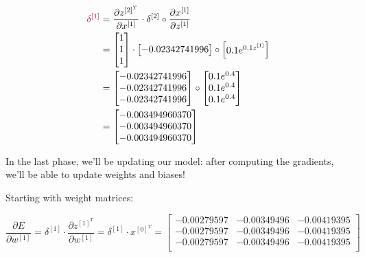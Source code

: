 \documentclass[12pt]{article}
\begin{document}
\begin{enumerate}[leftmargin=\labelsep]
        \begin{equation*}
          \begin{aligned}
            \textcolor{purple}{\delta^{[1]}} &= \frac{\partial z^{[2]^T}}{\partial x^{[1]}} \cdot \delta^{[2]} \circ \frac{\partial x^{[1]}}{\partial z^{[1]}} \\
            &= \begin{bmatrix}
                1 \\
                1 \\
                1
              \end{bmatrix} \cdot \begin{bmatrix}
                - 0.02342741996
              \end{bmatrix} \circ \begin{bmatrix}
                0.1e^{0.1z^{[1]}}
              \end{bmatrix} \\
            &= \begin{bmatrix}
                - 0.02342741996 \\
                - 0.02342741996 \\
                - 0.02342741996
              \end{bmatrix} \circ \begin{bmatrix}
                0.1 e^{0.4} \\
                0.1 e^{0.4} \\
                0.1 e^{0.4}
              \end{bmatrix} \\
            &= \begin{bmatrix}
                - 0.003494960370 \\
                - 0.003494960370 \\
                - 0.003494960370
              \end{bmatrix}
          \end{aligned}
        \end{equation*}

        In the last phase, we'll be updating our model: after computing the gradients,
        we'll be able to update weights and biases!

        Starting with weight matrices:

          \begin{equation*}
              \frac{\partial E}{\partial w^{[1]}} = \delta^{[1]} \cdot
              \frac{\partial z^{[1]^T}}{\partial w^{[1]}}
              = \delta^{[1]} \cdot x^{[0]^T}
              = \begin{bmatrix}
                -0.00279597 & -0.00349496 & -0.00419395\\
                -0.00279597 & -0.00349496 & -0.00419395\\
                -0.00279597 & -0.00349496 & -0.00419395\\
              \end{bmatrix}
          \end{equation*}


\end{enumerate}
\end{document}
